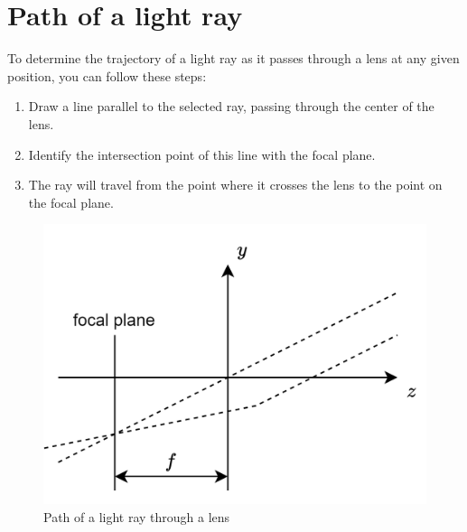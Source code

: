 \section{Path of a light ray}

To determine the trajectory of a light ray as it passes through a lens at any given position, you can follow these steps:
\begin{enumerate}
    \item Draw a line parallel to the selected ray, passing through the center of the lens.
    \item Identify the intersection point of this line with the focal plane.
    \item The ray will travel from the point where it crosses the lens to the point on the focal plane.
\end{enumerate}
\begin{figure}[H]
    \centering
    \includegraphics[width=0.4\linewidth]{images/path.png}
    \caption{Path of a light ray through a lens}
\end{figure}